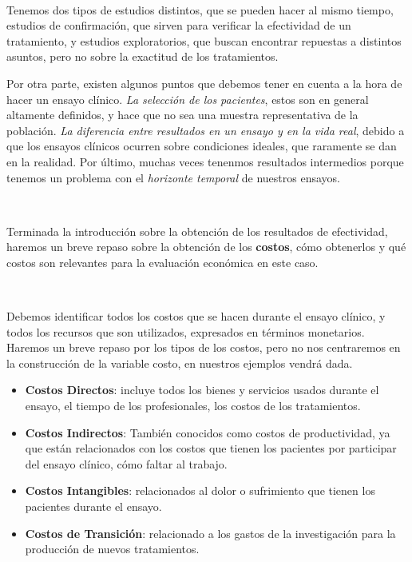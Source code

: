 \documentclass{article}
\begin{document}
\

Tenemos dos tipos de estudios distintos, que se pueden hacer al mismo tiempo, estudios de confirmación, que sirven para verificar la efectividad de un tratamiento, y estudios exploratorios, que buscan encontrar repuestas a distintos asuntos, pero no sobre la exactitud de los tratamientos.

Por otra parte, existen algunos puntos que debemos tener en cuenta a la hora de hacer un ensayo clínico. \textit{La selección de los pacientes}, estos son en general altamente definidos, y hace que no sea una muestra representativa de la población. \textit{La diferencia entre resultados en un ensayo y en la vida real}, debido a que los ensayos clínicos ocurren sobre condiciones ideales, que raramente se dan en la realidad. Por último, muchas veces tenenmos resultados intermedios porque tenemos un problema con el \textit{horizonte temporal} de nuestros ensayos.

\

Terminada la introducción sobre la obtención de los resultados de efectividad, haremos un breve repaso sobre la obtención de los \textbf{costos}, cómo obtenerlos y qué costos son relevantes para la evaluación económica en este caso.

\

Debemos identificar todos los costos que se hacen durante el ensayo clínico, y todos los recursos que son utilizados, expresados en términos monetarios. Haremos un breve repaso por los tipos de los costos, pero no nos centraremos en la construcción de la variable costo, en nuestros ejemplos vendrá dada.

\begin{itemize}
    \item \textbf{Costos Directos}: incluye todos los bienes y servicios usados durante el ensayo, el tiempo de los profesionales, los costos de los tratamientos.

    \item \textbf{Costos Indirectos}: También conocidos como costos de productividad, ya que están relacionados con los costos que tienen los pacientes por participar del ensayo clínico, cómo faltar al trabajo.

    \item \textbf{Costos Intangibles}: relacionados al dolor o sufrimiento que tienen los pacientes durante el ensayo.

    \item \textbf{Costos de Transición}: relacionado a los gastos de la investigación para la producción de nuevos tratamientos.
\end{itemize}
\end{document}
